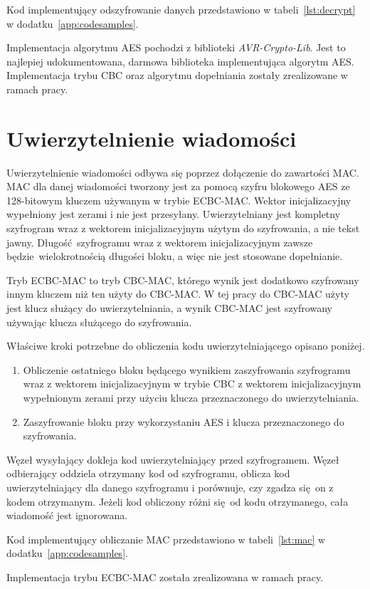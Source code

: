 Kod implementujący odszyfrowanie danych przedstawiono w tabeli~\ref{lst:decrypt} w dodatku~\ref{app:codesamples}.

Implementacja algorytmu AES pochodzi z biblioteki \emph{AVR-Crypto-Lib}. Jest to najlepiej udokumentowana, darmowa biblioteka implementująca algorytm AES. Implementacja trybu CBC oraz algorytmu dopełniania zostały zrealizowane w ramach pracy.

\section{Uwierzytelnienie wiadomości}
\label{sec:auth}

Uwierzytelnienie wiadomości odbywa się poprzez dołączenie do zawartości MAC. MAC dla danej wiadomości tworzony jest za pomocą szyfru blokowego AES ze 128-bitowym kluczem używanym w trybie ECBC-MAC. Wektor inicjalizacyjny wypełniony jest zerami i nie jest przesyłany. Uwierzytelniany jest kompletny szyfrogram wraz z wektorem inicjalizacyjnym użytym do szyfrowania, a nie tekst jawny. Długość szyfrogramu wraz z wektorem inicjalizacyjnym zawsze będzie wielokrotnością długości bloku, a więc nie jest stosowane dopełnianie.

Tryb ECBC-MAC to tryb CBC-MAC, którego wynik jest dodatkowo szyfrowany innym kluczem niż ten użyty do CBC-MAC. W tej pracy do CBC-MAC użyty jest klucz służący do uwierzytelniania, a wynik CBC-MAC jest szyfrowany używając klucza służącego do szyfrowania.

Właściwe kroki potrzebne do obliczenia kodu uwierzytelniającego opisano poniżej.

\begin{enumerate}
\item Obliczenie ostatniego bloku będącego wynikiem zaszyfrowania szyfrogramu wraz z wektorem inicjalizacyjnym w trybie CBC z wektorem inicjalizacyjnym wypełnionym zerami przy użyciu klucza przeznaczonego do uwierzytelniania.
\item Zaszyfrowanie bloku przy wykorzystaniu AES i klucza przeznaczonego do szyfrowania.
\end{enumerate}

Węzeł wysyłający dokleja kod uwierzytelniający przed szyfrogramem. Węzeł odbierający oddziela otrzymany kod od szyfrogramu, oblicza kod uwierzytelniający dla danego szyfrogramu i porównuje, czy zgadza się on z kodem otrzymanym. Jeżeli kod obliczony różni się od kodu otrzymanego, cała wiadomość jest ignorowana.

Kod implementujący obliczanie MAC przedstawiono w tabeli~\ref{lst:mac} w dodatku~\ref{app:codesamples}.

Implementacja trybu ECBC-MAC została zrealizowana w ramach pracy.
